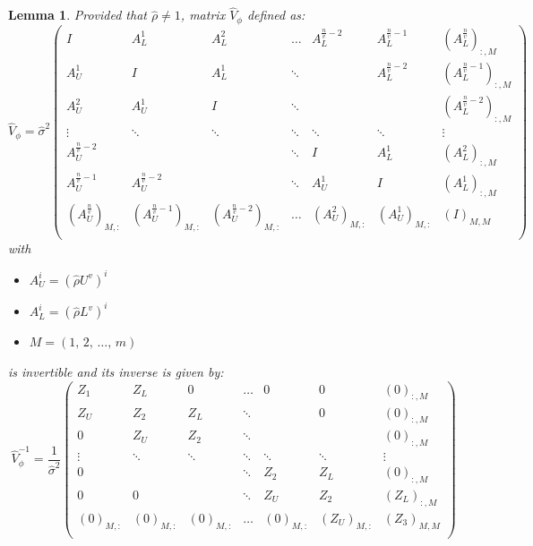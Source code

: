 \documentclass[11pt,dvipsnames]{article}
\newtheorem{lemma}{Lemma}
\begin{document}
\begin{appendices}
\begin{lemma}\label{lemm:VphiInv}
Provided that $ \hat{\rho} \neq 1 $, matrix $ \widehat{V}_{\phi} $ defined as:
\begin{equation}
\widehat{V}_{\phi}=
\hat{\sigma}^{2}
\begin{pmatrix}
I  & A_{L}^{1} & A_{L}^{2} & \dots & A_{L}^{\frac{n}{v}-2} & A_{L}^{\frac{n}{v}-1} & (A_{L}^{\frac{n}{v}})_{:,M} \\
A_{U}^{1}  & I & A_{L}^{1} & \ddots & & A_{L}^{\frac{n}{v}-2} & (A_{L}^{\frac{n}{v}-1})_{:,M}\\
A_{U}^{2}  & A_{U}^{1} & I & \ddots &  &  & (A_{L}^{\frac{n}{v}-2})_{:,M}\\
\vdots & \ddots  & \ddots  & \ddots & \ddots & \ddots & \vdots\\
A_{U}^{\frac{n}{v}-2} &   &   & \ddots & I & A_{L}^{1} & (A_{L}^{2})_{:,M}\\
A_{U}^{\frac{n}{v}-1}  & A_{U}^{\frac{n}{v}-2} &   & \ddots & A_{U}^{1}  & I & (A_{L}^{1})_{:,M}\\
(A_{U}^{\frac{n}{v}})_{M,:}  & (A_{U}^{\frac{n}{v}-1})_{M,:} & (A_{U}^{\frac{n}{v}-2})_{M,:} & \dots & (A_{U}^{2})_{M,:} & (A_{U}^{1})_{M,:}  &  (I)_{M,M} \\
\end{pmatrix}
\end{equation}
with
\begin{itemize}
\item $ A_{U}^{i}=\left(\hat{\rho} U^{v}\right)^{i}  $
\item $ A_{L}^{i}=\left(\hat{\rho} L^{v}\right)^{i}  $
\item $ M=\left(1,\,2,\,\ldots,\,m \right)  $ 
\end{itemize}
is invertible and its inverse is given by:
\begin{equation}
\widehat{V}_{\phi}^{-1}=
\dfrac{1}{\hat{\sigma}^{2}}
\begin{pmatrix}
Z_{1}  & Z_{L} & 0 & \dots & 0 & 0 & (0)_{:,M} \\
Z_{U} &  Z_{2} & Z_{L} & \ddots & & 0& (0)_{:,M}\\
0  & Z_{U}  & Z_{2} & \ddots &  &  & (0)_{:,M}\\
\vdots & \ddots  & \ddots  & \ddots & \ddots & \ddots & \vdots\\
0 &   &   & \ddots & Z_{2} & Z_{L} & (0)_{:,M}\\
0  & 0 &   & \ddots & Z_{U}  & Z_{2} & (Z_{L})_{:,M}\\
(0)_{M,:}  & (0)_{M,:} & (0)_{M,:} & \dots & (0)_{M,:} & (Z_{U})_{M,:}  & (Z_{3})_{M,M} \\

\end{pmatrix}
\end{equation}
\end{lemma}
\end{appendices}
\end{document}
